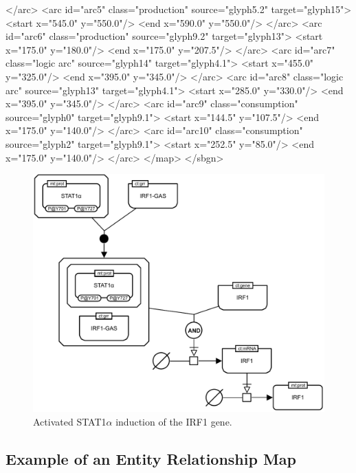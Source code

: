 \begin{example}
        </arc>
        <arc id="arc5" class="production" source="glyph5.2" target="glyph15">
            <start x="545.0" y="550.0"/>
            <end x="590.0" y="550.0"/>
        </arc>
        <arc id="arc6" class="production" source="glyph9.2" target="glyph13">
            <start x="175.0" y="180.0"/>
            <end x="175.0" y="207.5"/>
        </arc>
        <arc id="arc7" class="logic arc" source="glyph14" target="glyph4.1">
            <start x="455.0" y="325.0"/>
            <end x="395.0" y="345.0"/>
        </arc>
        <arc id="arc8" class="logic arc" source="glyph13" target="glyph4.1">
            <start x="285.0" y="330.0"/>
            <end x="395.0" y="345.0"/>
        </arc>
        <arc id="arc9" class="consumption" source="glyph0" target="glyph9.1">
            <start x="144.5" y="107.5"/>
            <end x="175.0" y="140.0"/>
        </arc>
        <arc id="arc10" class="consumption" source="glyph2" target="glyph9.1">
            <start x="252.5" y="85.0"/>
            <end x="175.0" y="140.0"/>
        </arc>
    </map>
</sbgn>
\end{example}

\begin{figure}[!ht]
  \centering
  \includegraphics[scale=0.69]{figures/pd_example.pdf}
\caption{Activated STAT1$\alpha$ induction of the IRF1 gene.}
  \label{fig:pd_example}
\end{figure}

\clearpage

\subsection{Example of an Entity Relationship Map}

